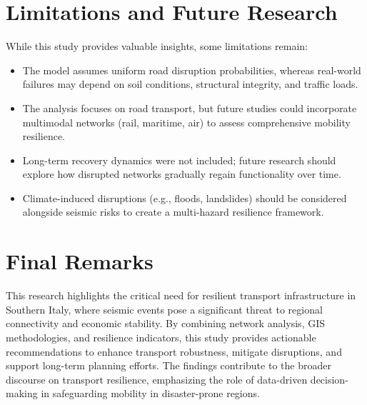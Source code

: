 \section{Limitations and Future Research}
While this study provides valuable insights, some limitations remain:

\begin{itemize}
    \item The model assumes uniform road disruption probabilities, whereas real-world failures may depend on soil conditions, structural integrity, and traffic loads.
    \item The analysis focuses on road transport, but future studies could incorporate multimodal networks (rail, maritime, air) to assess comprehensive mobility resilience.
    \item Long-term recovery dynamics were not included; future research should explore how disrupted networks gradually regain functionality over time.
    \item Climate-induced disruptions (e.g., floods, landslides) should be considered alongside seismic risks to create a multi-hazard resilience framework.
\end{itemize}

\section{Final Remarks}
This research highlights the critical need for resilient transport infrastructure in Southern Italy, where seismic events pose a significant threat to regional connectivity and economic stability. By combining network analysis, GIS methodologies, and resilience indicators, this study provides actionable recommendations to enhance transport robustness, mitigate disruptions, and support long-term planning efforts. The findings contribute to the broader discourse on transport resilience, emphasizing the role of data-driven decision-making in safeguarding mobility in disaster-prone regions.
